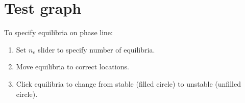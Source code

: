 \documentclass{ximera}
\begin{document}
\section{Test graph}


To specify equilibria on phase line:
\begin{enumerate}
\item Set $n_e$ slider to specify number of equilibria.
\item Move equilibria to correct locations.
\item Click equilibria to change from stable (filled circle) to unstable (unfilled circle).
\end{enumerate}
\end{document}
